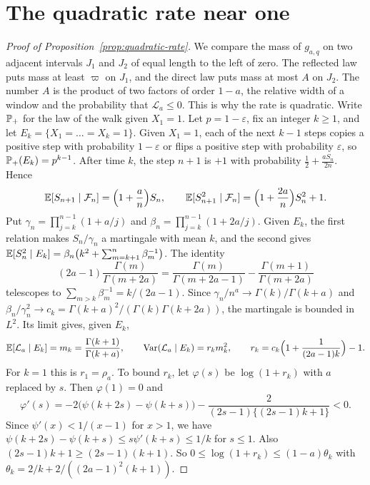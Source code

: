 \section{The quadratic rate near one}\label{app:quadratic-rate}

\begin{proof}[Proof of Proposition~\ref{prop:quadratic-rate}]
We compare the mass of $g_{a,q}$ on two adjacent intervals $J_1$
and $J_2$ of equal length to the left of zero. The reflected law puts
mass at least $\varpi$ on $J_1$, and the direct law puts mass at most
$A$ on $J_2$. The number $A$ is the product of two factors of order
$1-a$, the relative width of a window and the probability that
$\mathcal L_a\le0$. This is why the rate is quadratic.
Write $\mathbb{P}_+$ for the law of the walk given $X_1=1$. Let
$p=1-\varepsilon$, fix an integer $k\ge1$, and let
$E_k=\{X_1=\dots=X_k=1\}$. Given $X_1=1$, each of the next $k-1$ steps
copies a positive step with probability $1-\varepsilon$ or flips a
positive step with probability $\varepsilon$, so
$\mathbb{P}_+(E_k)=p^{k-1}$. After time $k$, the step $n+1$ is $+1$ with
probability $\frac12+\frac{aS_n}{2n}$. Hence
\[
 \mathbb{E}[S_{n+1}\mid\mathcal F_n]=\Bigl(1+\frac an\Bigr)S_n,\qquad
 \mathbb{E}[S_{n+1}^2\mid\mathcal F_n]=\Bigl(1+\frac{2a}n\Bigr)S_n^2+1.
\]
Put $\gamma_n=\prod_{j=k}^{n-1}(1+a/j)$ and
$\beta_n=\prod_{j=k}^{n-1}(1+2a/j)$. Given $E_k$, the first relation
makes $S_n/\gamma_n$ a martingale with mean $k$, and the second gives
$\mathbb{E}[S_n^2\mid E_k]=\beta_n\bigl(k^2+\sum_{m=k+1}^n\beta_m^{-1}\bigr)$.
The identity
\[
 (2a-1)\frac{\Gamma(m)}{\Gamma(m+2a)}
 =\frac{\Gamma(m)}{\Gamma(m+2a-1)}-\frac{\Gamma(m+1)}{\Gamma(m+2a)}
\]
telescopes to $\sum_{m>k}\beta_m^{-1}=k/(2a-1)$. Since
$\gamma_n/n^a\to\Gamma(k)/\Gamma(k+a)$ and
$\beta_n/\gamma_n^2\to c_k=\Gamma(k+a)^2/(\Gamma(k)\Gamma(k+2a))$, the
martingale is bounded in $L^2$. Its limit gives, given $E_k$,
\[
 \mathbb{E}[\mathcal L_a\mid E_k]=m_k=\frac{\Gamma(k+1)}{\Gamma(k+a)},\qquad
 \operatorname{Var}(\mathcal L_a\mid E_k)=r_km_k^2,\qquad
 r_k=c_k\Bigl(1+\frac1{(2a-1)k}\Bigr)-1.
\]
For $k=1$ this is $r_1=\rho_a$. To bound $r_k$, let $\varphi(s)$ be
$\log(1+r_k)$ with $a$ replaced by $s$. Then $\varphi(1)=0$ and
\[
 \varphi'(s)=-2\bigl(\psi(k+2s)-\psi(k+s)\bigr)
 -\frac2{(2s-1)\{(2s-1)k+1\}}<0.
\]
Since $\psi'(x)<1/(x-1)$ for $x>1$, we have
$\psi(k+2s)-\psi(k+s)\le s\psi'(k+s)\le1/k$ for $s\le1$. Also
$(2s-1)k+1\ge(2s-1)(k+1)$. So $0\le\log(1+r_k)\le(1-a)\theta_k$ with
$\theta_k=2/k+2/((2a-1)^2(k+1))$.


\end{proof}
